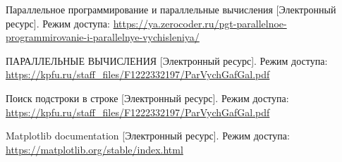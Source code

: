 


\renewcommand\bibname{Список использованных источников}
\begin{thebibliography}{}
	
	 Параллельное программирование и параллельные вычисления [Электронный ресурс]. Режим доступа: \url{https://ya.zerocoder.ru/pgt-parallelnoe-programmirovanie-i-parallelnye-vychisleniya/}
	
	
	 ПАРАЛЛЕЛЬНЫЕ ВЫЧИСЛЕНИЯ [Электронный ресурс]. Режим доступа: \url{https://kpfu.ru/staff_files/F1222332197/ParVychGafGal.pdf}


	 Поиск подстроки в строке [Электронный ресурс]. Режим доступа: \url{https://kpfu.ru/staff_files/F1222332197/ParVychGafGal.pdf}
	
	 Matplotlib documentation [Электронный ресурс]. Режим доступа: \url{https://matplotlib.org/stable/index.html}
	
\end{thebibliography}
